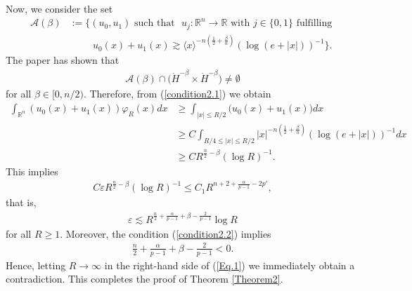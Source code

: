\documentclass[11pt,reqno]{amsart}
\begin{document}
Now, we consider the set 
            \begin{align*}
                \mathcal{A}(\beta) &:= \Big\{(u_0, u_1) \text{ such that }  \,\, u_j: \mathbb{R}^n \to \mathbb{R} \text{ with } j \in \{0,1\} \text{ fulfilling } \\
                &\hspace{1cm} u_0(x) + u_1(x) \gtrsim  \langle x\rangle^{-n(\frac{1}{2}+\frac{\beta}{n})}(\log(e+|x|))^{-1}\Big\}.  
            \end{align*}
The paper \cite[page 17]{ChenReissig2023} has shown that
\begin{align*}
    \mathcal{A}(\beta) \cap \big(\dot{H}^{-\beta} \times \dot{H}^{-\beta}\big) \ne \emptyset
\end{align*}
for all $\beta \in [0, n/2)$.
 Therefore, from (\ref{condition2.1}) we obtain
    \begin{align*}
        \int_{\mathbb{R}^n} (u_0(x) +u_1(x))\varphi_R(x) dx &\geq \int_{|x| \leq R/2} \big(u_0(x) +u_1(x)\big) dx\\
        &\geq C\int_{R/4 \leq |x| \leq R/2} |x|^{-n(\frac{1}{2}+\frac{\beta}{n})} (\log(e+|x|))^{-1} dx \\
        &\geq C R^{\frac{n}{2}-\beta} (\log R)^{-1}.
    \end{align*}
    This implies 
    \begin{align*}
       C \varepsilon R^{\frac{n}{2}-\beta} (\log R)^{-1} \leq C_1 R^{n+2+\frac{\alpha}{p-1}-2p'},
    \end{align*}
    that is,
    \begin{align}\label{Eq.1}
        \varepsilon  \lesssim R^{\frac{n}{2}+\frac{\alpha}{p-1}+\beta-\frac{2}{p-1}} \log R
    \end{align}
    for all $R \geq 1$.
    Moreover, the condition (\ref{condition2.2}) implies
    \begin{align*}
         \frac{n}{2}+\frac{\alpha}{p-1}+\beta - \frac{2}{p-1} < 0.
    \end{align*}
     Hence, letting $R \to \infty$ in the right-hand side of (\ref{Eq.1}) we immediately obtain a contradiction. This completes the proof of Theorem \ref{Theorem2}.
\end{document}
